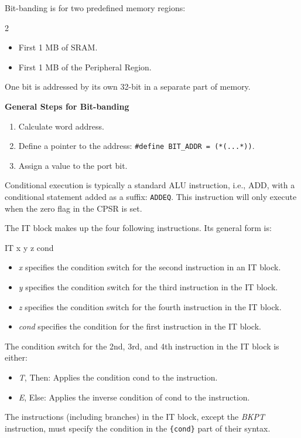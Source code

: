 \documentclass[a4paper,11pt]{article}
\newcommand{\code}[1]{\texttt{#1}}
\begin{document}
Bit-banding is for two predefined memory regions:
\begin{multicols}{2}
\begin{itemize}
  \item First 1 MB of SRAM.
  \item First 1 MB of the Peripheral Region.
\end{itemize}
\end{multicols}
One bit is addressed by its own 32-bit in a separate part of memory.

\textbf{General Steps for Bit-banding}
\begin{enumerate}
  \item Calculate word address.
  \item Define a pointer to the address: \code{\#define BIT\_ADDR = (*(...*))}.
  \item Assign a value to the port bit.
\end{enumerate}

Conditional execution is typically a standard ALU instruction, i.e., ADD, with a conditional statement added as a suffix: \code{ADDEQ}. This instruction will only execute when the zero flag in the CPSR is set.

The IT block makes up the four following instructions. Its general form is:
\begin{notecode}[language={}]
IT {x {y {z} } } {cond}
\end{notecode}
\begin{itemize}
  \item \emph{x} specifies the condition switch for the second instruction in an IT block.
  \item \emph{y} specifies the condition switch for the third instruction in the IT block.
  \item \emph{z} specifies the condition switch for the fourth instruction in the IT block.
  \item \emph{cond} specifies the condition for the first instruction in the IT block.
\end{itemize}
The condition switch for the 2nd, 3rd, and 4th instruction in the IT block is either:
\begin{itemize}
  \item \emph{T}, Then: Applies the condition cond to the instruction.
  \item \emph{E}, Else: Applies the inverse condition of cond to the instruction.
\end{itemize}
The instructions (including branches) in the IT block, except the \emph{BKPT} instruction, must specify the condition in the \code{\{cond\}} part of their syntax.
\end{document}
